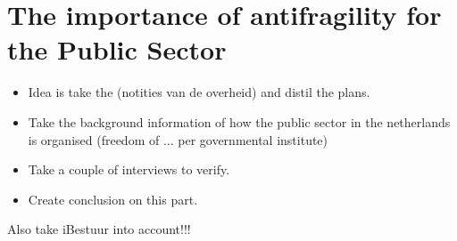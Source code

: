 \chapter{The importance of antifragility for the Public Sector}

\begin{itemize}
\item{Idea is take the (notities van de overheid) and distil the plans.}
\item{Take the background information of how the public sector in the netherlands is organised (freedom of ... per governmental institute)}
\item{Take a couple of interviews to verify.}
\item{Create conclusion on this part.}
\end{itemize}

\begin{remark}
	Also take iBestuur into account!!!
\end{remark}
